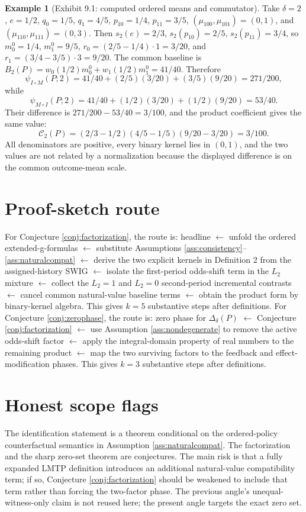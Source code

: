 \documentclass[11pt]{article}
\theoremstyle{definition}
\newtheorem{example}{Example}
\theoremstyle{plain}
\theoremstyle{remark}
\begin{document}
\begin{example}[Exhibit 9.1: computed ordered means and commutator]\label{ex:computed}
Take $\delta=2$, $e=1/2$, $q_0=1/5$, $q_1=4/5$, $p_{10}=1/4$, $p_{11}=3/5$, $(\mu_{100},\mu_{101})=(0,1)$, and $(\mu_{110},\mu_{111})=(0,3)$. Then $s_2(e)=2/3$, $s_2(p_{10})=2/5$, $s_2(p_{11})=3/4$, so $m_0^0=1/4$, $m_1^0=9/5$, $r_0=(2/5-1/4)\cdot1=3/20$, and $r_1=(3/4-3/5)\cdot3=9/20$. The common baseline is $B_2(P)=w_0(1/2)m_0^0+w_1(1/2)m_1^0=41/40$. Therefore
\[
\psi_{I\circ M}(P;2)=41/40+(2/5)(3/20)+(3/5)(9/20)=271/200,
\]
while
\[
\psi_{M\circ I}(P;2)=41/40+(1/2)(3/20)+(1/2)(9/20)=53/40.
\]
Their difference is $271/200-53/40=3/100$, and the product coefficient gives the same value:
\[
\mathcal C_2(P)=(2/3-1/2)(4/5-1/5)(9/20-3/20)=3/100.
\]
All denominators are positive, every binary kernel lies in $(0,1)$, and the two values are not related by a normalization because the displayed difference is on the common outcome-mean scale.
\end{example}

\section{Proof-sketch route}
For Conjecture \ref{conj:factorization}, the route is: headline $\leftarrow$ unfold the ordered extended-g-formulas $\leftarrow$ substitute Assumptions \ref{ass:consistency}--\ref{ass:naturalcompat} $\leftarrow$ derive the two explicit kernels in Definition 2 from the assigned-history SWIG $\leftarrow$ isolate the first-period odds-shift term in the $L_2$ mixture $\leftarrow$ collect the $L_2=1$ and $L_2=0$ second-period incremental contrasts $\leftarrow$ cancel common natural-value baseline terms $\leftarrow$ obtain the product form by binary-kernel algebra. This gives $k=5$ substantive steps after definitions. For Conjecture \ref{conj:zerophase}, the route is: zero phase for $\Delta_\delta(P)$ $\leftarrow$ Conjecture \ref{conj:factorization} $\leftarrow$ use Assumption \ref{ass:nondegenerate} to remove the active odds-shift factor $\leftarrow$ apply the integral-domain property of real numbers to the remaining product $\leftarrow$ map the two surviving factors to the feedback and effect-modification phases. This gives $k=3$ substantive steps after definitions.

\section{Honest scope flags}
The identification statement is a theorem conditional on the ordered-policy counterfactual semantics in Assumption \ref{ass:naturalcompat}. The factorization and the sharp zero-set theorem are conjectures. The main risk is that a fully expanded LMTP definition introduces an additional natural-value compatibility term; if so, Conjecture \ref{conj:factorization} should be weakened to include that term rather than forcing the two-factor phase. The previous angle's unequal-witness-only claim is not reused here; the present angle targets the exact zero set.
\end{document}
